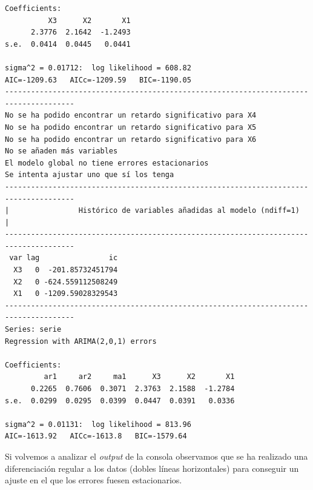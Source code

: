 \documentclass[
  12pt,
  a4paper]{article}
\begin{document}
\begin{verbatim}
Coefficients:
          X3      X2       X1
      2.3776  2.1642  -1.2493
s.e.  0.0414  0.0445   0.0441

sigma^2 = 0.01712:  log likelihood = 608.82
AIC=-1209.63   AICc=-1209.59   BIC=-1190.05
--------------------------------------------------------------------------------------
No se ha podido encontrar un retardo significativo para X4
No se ha podido encontrar un retardo significativo para X5
No se ha podido encontrar un retardo significativo para X6
No se añaden más variables
El modelo global no tiene errores estacionarios
Se intenta ajustar uno que sí los tenga
--------------------------------------------------------------------------------------
|                Histórico de variables añadidas al modelo (ndiff=1)                 |
--------------------------------------------------------------------------------------
 var lag                ic
  X3   0  -201.85732451794
  X2   0 -624.559112508249
  X1   0 -1209.59028329543
--------------------------------------------------------------------------------------
Series: serie 
Regression with ARIMA(2,0,1) errors 

Coefficients:
         ar1     ar2     ma1      X3      X2       X1
      0.2265  0.7606  0.3071  2.3763  2.1588  -1.2784
s.e.  0.0299  0.0295  0.0399  0.0447  0.0391   0.0336

sigma^2 = 0.01131:  log likelihood = 813.96
AIC=-1613.92   AICc=-1613.8   BIC=-1579.64
\end{verbatim}

Si volvemos a analizar el \emph{output} de la consola observamos que se
ha realizado una diferenciación regular a los datos (dobles líneas
horizontales) para conseguir un ajuste en el que los errores fuesen
estacionarios.
\end{document}
